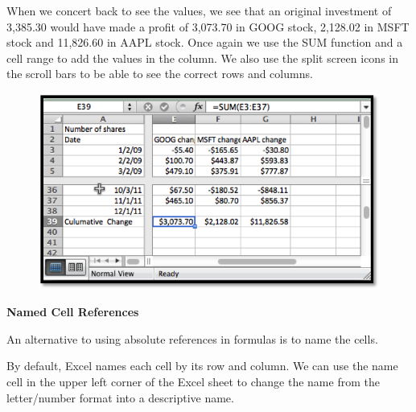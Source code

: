 \documentclass[10pt,]{book}
\newcommand{\terminology}[1]{\textbf{#1}}
\theoremstyle{plain}
\theoremstyle{definition}
\newenvironment{assemblage-untitled}{\mdfsetup{%
roundcorner=2ex, backgroundcolor=blue!5,linecolor=blue!75!black,}%
\begin{mdframed}}{\end{mdframed}}
\theoremstyle{definition}
\begin{document}
When we concert back to see the values, we see that an original investment of \textdollar{}3,385.30 would have made a profit of \textdollar{}3,073.70 in GOOG stock, \textdollar{}2,128.02 in MSFT stock and \textdollar{}11,826.60 in AAPL stock.  Once again we use the SUM function and a cell range to add the values in the column.  We also use the split screen icons in the scroll bars to be able to see the correct rows and columns.%
\leavevmode%
\begin{figure}
\centering
\includegraphics[width=0.8\linewidth]{images/sec1-3-13.png}
\end{figure}
\par
\terminology{Named Cell References}%
\par
An alternative to using absolute references in formulas is to name the cells. %
\begin{assemblage-untitled}\label{assemblage-9}
By default, Excel names each cell by its row and column.  We can use the name cell in the upper left corner of the Excel sheet to change the name from the letter/number format into a descriptive name.%
\end{assemblage-untitled}
\par
\end{document}
